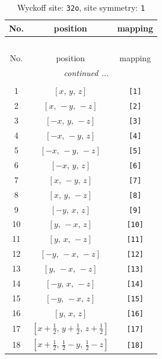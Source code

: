 \documentclass[fleqn,8pt]{jsarticle}
\begin{document}
\renewcommand{\arraystretch}{1.2}
\begin{longtable}{ccc}
\caption{Wyckoff site: {\tt 32o}, site symmetry: {\tt 1}}
 \\
 \hline \hline
No. & position & mapping \\ \hline \endfirsthead

\multicolumn{2}{l}{\tablename\ \thetable{}} \\
 \hline \hline
No. & position & mapping \\ \hline \endhead

 \hline \hline
\multicolumn{2}{r}{\footnotesize\it continued ...} \\ \endfoot

 \hline \hline
\multicolumn{2}{r}{} \\ \endlastfoot

1 & $\left[ x,\, y,\, z \right]$ & {\tt [1]} \\ \hline
2 & $\left[ x,\, - y,\, - z \right]$ & {\tt [2]} \\ \hline
3 & $\left[ - x,\, y,\, - z \right]$ & {\tt [3]} \\ \hline
4 & $\left[ - x,\, - y,\, z \right]$ & {\tt [4]} \\ \hline
5 & $\left[ - x,\, - y,\, - z \right]$ & {\tt [5]} \\ \hline
6 & $\left[ - x,\, y,\, z \right]$ & {\tt [6]} \\ \hline
7 & $\left[ x,\, - y,\, z \right]$ & {\tt [7]} \\ \hline
8 & $\left[ x,\, y,\, - z \right]$ & {\tt [8]} \\ \hline
9 & $\left[ - y,\, x,\, z \right]$ & {\tt [9]} \\ \hline
10 & $\left[ y,\, - x,\, z \right]$ & {\tt [10]} \\ \hline
11 & $\left[ y,\, x,\, - z \right]$ & {\tt [11]} \\ \hline
12 & $\left[ - y,\, - x,\, - z \right]$ & {\tt [12]} \\ \hline
13 & $\left[ y,\, - x,\, - z \right]$ & {\tt [13]} \\ \hline
14 & $\left[ - y,\, x,\, - z \right]$ & {\tt [14]} \\ \hline
15 & $\left[ - y,\, - x,\, z \right]$ & {\tt [15]} \\ \hline
16 & $\left[ y,\, x,\, z \right]$ & {\tt [16]} \\ \hline
17 & $\left[ x + \frac{1}{2},\, y + \frac{1}{2},\, z + \frac{1}{2} \right]$ & {\tt [17]} \\ \hline
18 & $\left[ x + \frac{1}{2},\, \frac{1}{2} - y,\, \frac{1}{2} - z \right]$ & {\tt [18]} \\ \hline

\end{longtable}
\end{document}
